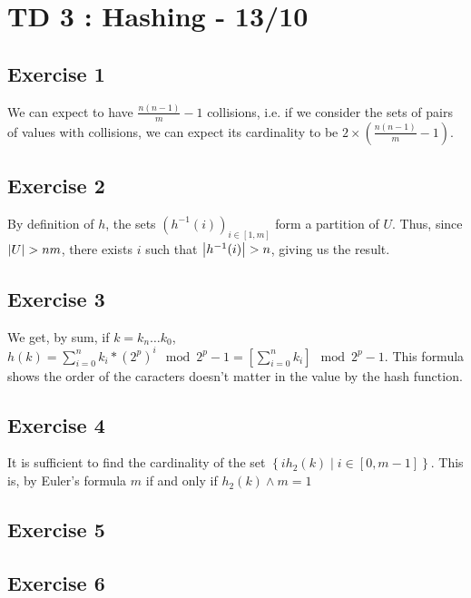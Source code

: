 \documentclass{cours}
\begin{document}
\section{TD 3 : Hashing - 13/10}
\subsection{Exercise 1}
We can expect to have $\frac{n(n-1)}{m} - 1$ collisions, i.e. if we consider the sets of pairs of values with collisions, we can expect its cardinality to be $2\times (\frac{n(n-1)}{m} - 1)$.

\subsection{Exercise 2}
By definition of $h$, the sets $\left(h^{-1}(i)\right)_{i \in \left[1, m\right]}$ form a partition of $U$. Thus, since $\left|U\right| > nm$, there exists $i$ such that $\left|h^{-1}(i)\right| > n$, giving us the result.

\subsection{Exercise 3}
We get, by sum, if $k = k_{n}\ldots k_{0}$, $h(k) = \sum_{i = 0}^{n} k_{i}*(2^{p})^{i} \mod 2^{p}-1 = \left[\sum_{i = 0}^{n} k_{i}\right] \mod 2^{p}-1$. This formula shows the order of the caracters doesn't matter in the value by the hash function.

\subsection{Exercise 4}
It is sufficient to find the cardinality of the set $\left\{ih_{2}(k) \mid i \in \left[0, m-1\right]\right\}$. This is, by Euler's formula $m$ if and only if $h_{2}(k) \wedge m = 1$

\subsection{Exercise 5}

\subsection{Exercise 6}
\end{document}
